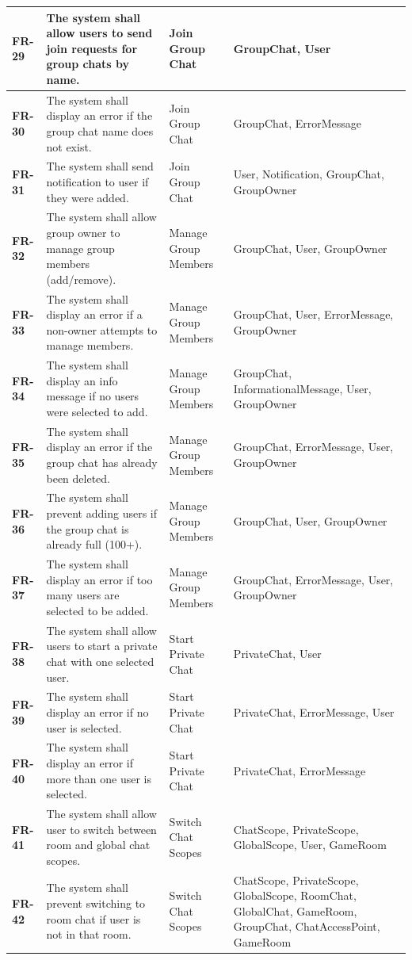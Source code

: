 \documentclass[]{VUMIFTemplateClass}
\begin{document}
\begin{longtable}{|p{3cm}|p{5.5cm}|l|p{4cm}|}
\textbf{FR-29} & The system shall allow users to send join requests for group chats by name. & Join Group Chat & GroupChat, User \\
\hline
\textbf{FR-30} & The system shall display an error if the group chat name does not exist. & Join Group Chat & GroupChat, ErrorMessage \\
\hline
\textbf{FR-31} & The system shall send notification to user if they were added. & Join Group Chat & User, Notification, GroupChat, GroupOwner \\
\hline
\textbf{FR-32} & The system shall allow group owner to manage group members (add/remove). & Manage Group Members & GroupChat, User, GroupOwner  \\
\hline
\textbf{FR-33} & The system shall display an error if a non-owner attempts to manage members. & Manage Group Members & GroupChat, User, ErrorMessage, GroupOwner  \\
\hline
\textbf{FR-34} & The system shall display an info message if no users were selected to add. & Manage Group Members & GroupChat, InformationalMessage, User, GroupOwner  \\
\hline
\textbf{FR-35} & The system shall display an error if the group chat has already been deleted. & Manage Group Members & GroupChat, ErrorMessage, User, GroupOwner  \\
\hline
\textbf{FR-36} & The system shall prevent adding users if the group chat is already full (100+). & Manage Group Members & GroupChat, User, GroupOwner \\
\hline
\textbf{FR-37} & The system shall display an error if too many users are selected to be added. & Manage Group Members & GroupChat, ErrorMessage, User, GroupOwner \\
\hline
\textbf{FR-38} & The system shall allow users to start a private chat with one selected user. & Start Private Chat & PrivateChat, User \\
\hline
\textbf{FR-39} & The system shall display an error if no user is selected. & Start Private Chat & PrivateChat, ErrorMessage, User \\
\hline
\textbf{FR-40} & The system shall display an error if more than one user is selected. & Start Private Chat & PrivateChat, ErrorMessage \\
\hline
\textbf{FR-41} & The system shall allow user to switch between room and global chat scopes. & Switch Chat Scopes & ChatScope,  PrivateScope, GlobalScope, User, GameRoom \\
\hline
\textbf{FR-42} & The system shall prevent switching to room chat if user is not in that room. & Switch Chat Scopes & ChatScope,  PrivateScope, GlobalScope, RoomChat, GlobalChat, GameRoom, GroupChat, ChatAccessPoint, GameRoom \\

\end{longtable}
\end{document}

